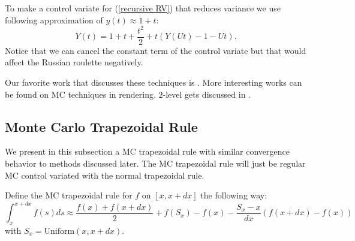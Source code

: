 \documentclass[a4paper,12pt]{article}
\begin{document}
\begin{example}
    To make a control variate for (\ref{recursive RV}) that reduces variance
    we use following approximation of $y(t) \approx 1+t$:
    \begin{equation}
        Y(t)= 1+t+\frac{t^{2}}{2} + t(Y(Ut)-1-Ut).
    \end{equation}
    Notice that we can cancel the constant term of the control variate
    but that would affect the Russian roulette negatively.
\end{example}

\vspace*{0.2cm}
\begin{pythonn}
\end{pythonn}

\begin{related}[MC modification]
    Our favorite work that discusses these techniques is \cite{veach_robust_nodate}.
    More interesting works can be found on MC techniques in rendering.
    $2$-level gets discussed in \cite{giles_multilevel_2013}.
\end{related}

\subsection{Monte Carlo Trapezoidal Rule}
We present in this subsection a MC trapezoidal rule with similar convergence behavior to
methods discussed later. The MC trapezoidal rule will just be
regular MC control variated with the normal trapezoidal rule.

\begin{definition}
    Define the MC trapezoidal rule for $f$ on $[x,x+dx]$ the following
    way:
    \begin{equation}
        \int_{x}^{x+dx} f(s)ds \approx
        \frac{f(x)+f(x+dx)}{2} + f(S_{x})-f(x)-\frac{S_{x}-x}{dx} \left(f(x+dx)-f(x)\right)
    \end{equation}
    with $S_{x} = \text{Uniform}(x,x+dx)$.
\end{definition}
\end{document}
